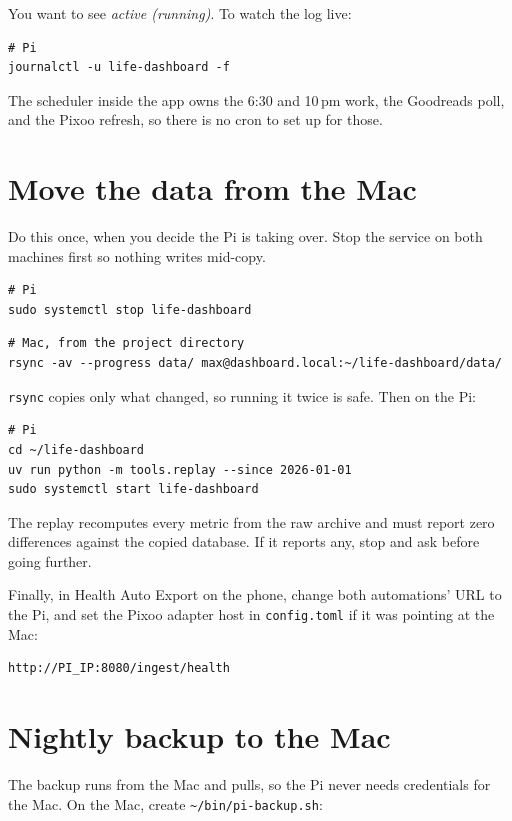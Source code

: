 \documentclass[11pt,letterpaper]{article}
\newcommand{\file}[1]{\texttt{#1}}
\newcommand{\cmd}[1]{\texttt{#1}}
\begin{document}
You want to see \emph{active (running)}. To watch the log live:

\begin{lstlisting}
# Pi
journalctl -u life-dashboard -f
\end{lstlisting}

The scheduler inside the app owns the 6:30 and 10\,pm work, the Goodreads poll, and the Pixoo refresh, so there is no cron to set up for those.

\section{Move the data from the Mac}

Do this once, when you decide the Pi is taking over. Stop the service on both machines first so nothing writes mid-copy.

\begin{lstlisting}
# Pi
sudo systemctl stop life-dashboard
\end{lstlisting}

\begin{lstlisting}
# Mac, from the project directory
rsync -av --progress data/ max@dashboard.local:~/life-dashboard/data/
\end{lstlisting}

\cmd{rsync} copies only what changed, so running it twice is safe. Then on the Pi:

\begin{lstlisting}
# Pi
cd ~/life-dashboard
uv run python -m tools.replay --since 2026-01-01
sudo systemctl start life-dashboard
\end{lstlisting}

The replay recomputes every metric from the raw archive and must report zero differences against the copied database. If it reports any, stop and ask before going further.

Finally, in Health Auto Export on the phone, change both automations' URL to the Pi, and set the Pixoo adapter host in \cmd{config.toml} if it was pointing at the Mac:

\begin{lstlisting}
http://PI_IP:8080/ingest/health
\end{lstlisting}

\section{Nightly backup to the Mac}

The backup runs from the Mac and pulls, so the Pi never needs credentials for the Mac. On the Mac, create \file{\textasciitilde/bin/pi-backup.sh}:
\end{document}
